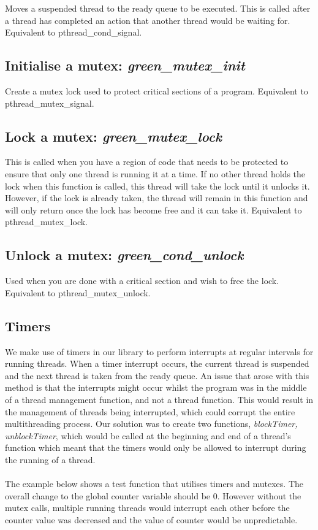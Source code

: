 \documentclass[11pt]{article}
\begin{document}
Moves a suspended thread to the ready queue to be executed. This is called after a thread has completed an action that another thread would be waiting for. Equivalent to pthread\_cond\_signal.

\subsection{Initialise a mutex: \textit{green\_mutex\_init}}

Create a mutex lock used to protect critical sections of a program. Equivalent to pthread\_mutex\_signal.

\subsection{Lock a mutex: \textit{green\_mutex\_lock}}

This is called when you have a region of code that needs to be protected to ensure that only one thread is running it at a time. If no other thread holds the lock when this function is called, this thread will take the lock until it unlocks it. However, if the lock is already taken, the thread will remain in this function and will only return once the lock has become free and it can take it. Equivalent to pthread\_mutex\_lock.

\subsection{Unlock a mutex: \textit{green\_cond\_unlock}}

Used when you are done with a critical section and wish to free the lock. Equivalent to pthread\_mutex\_unlock.

\subsection{Timers}

We make use of timers in our library to perform interrupts at regular intervals for running threads. When a timer interrupt occurs, the current thread is suspended and the next thread is taken from the ready queue. An issue that arose with this method is that the interrupts might occur whilst the program was in the middle of a thread management function, and not a thread function. This would result in the management of threads being interrupted, which could corrupt the entire multithreading process. Our solution was to create two functions, \textit{blockTimer, unblockTimer}, which would be called at the beginning and end of a thread's function which meant that the timers would only be allowed to interrupt during the running of a thread. 
\\
\\
The example below shows a test function that utilises timers and mutexes. The overall change to the global counter variable should be 0. However without the mutex calls, multiple running threads would interrupt each other before the counter value was decreased and the value of counter would be unpredictable.
\end{document}
